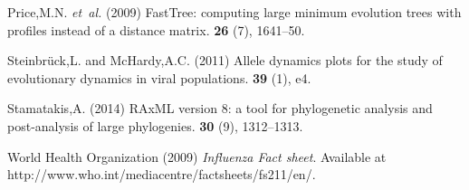 \documentclass{bioinfo}
\begin{document}
\begin{thebibliography}{}
Price,M.N. {\em et~al.} (2009{\em{}}) {FastTree:} computing
  large minimum evolution trees with profiles instead of a distance matrix.
 {\bf 26} (7), 1641--50.

Steinbr\"{u}ck,L. and McHardy,A.C. (2011{\em{}}) Allele dynamics plots for the study of evolutionary dynamics in viral populations.
 {\bf 39} (1), e4.

Stamatakis,A. (2014{\em{}}) {RAxML} version 8: a tool for phylogenetic analysis
  and post-analysis of large phylogenies.
 {\bf 30} (9), 1312--1313.

{World Health Organization} (2009{\em{}}) {\em {Influenza Fact sheet}}.
\newblock Available at http://www.who.int/mediacentre/factsheets/fs211/en/.

\end{thebibliography}
\end{document}
